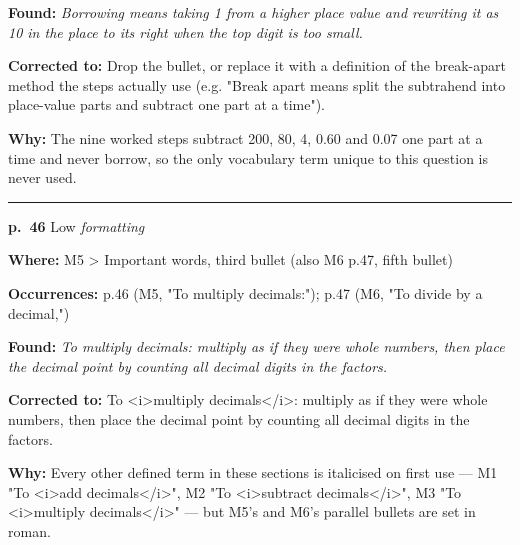 \documentclass[11pt]{article}
\newcommand{\sevlow}[1]{\textcolor{black!55}{#1}}
\begin{document}
\noindent\textbf{Found: }\textit{Borrowing means taking 1 from a higher place value and rewriting it as 10 in the place to its right when the top digit is too small.}\par
\noindent\textbf{Corrected to: }Drop the bullet, or replace it with a definition of the break-apart method the steps actually use (e.g. "Break apart means split the subtrahend into place-value parts and subtract one part at a time").\par
\noindent\textbf{Why: }The nine worked steps subtract 200, 80, 4, 0.60 and 0.07 one part at a time and never borrow, so the only vocabulary term unique to this question is never used.\par\vspace{4pt}
\noindent\rule{\textwidth}{0.4pt}\par\nobreak\vspace{2pt}
\noindent\textbf{p.~46} \quad \sevlow{Low} \quad \textit{formatting}\par
\noindent\textbf{Where: }M5 > Important words, third bullet (also M6 p.47, fifth bullet)\par
\noindent\textbf{Occurrences: }p.46 (M5, "To multiply decimals:"); p.47 (M6, "To divide by a decimal,")\par
\noindent\textbf{Found: }\textit{To multiply decimals: multiply as if they were whole numbers, then place the decimal point by counting all decimal digits in the factors.}\par
\noindent\textbf{Corrected to: }To <i>multiply decimals</i>: multiply as if they were whole numbers, then place the decimal point by counting all decimal digits in the factors.\par
\noindent\textbf{Why: }Every other defined term in these sections is italicised on first use --- M1 "To <i>add decimals</i>", M2 "To <i>subtract decimals</i>", M3 "To <i>multiply decimals</i>" --- but M5's and M6's parallel bullets are set in roman.\par\vspace{4pt}
\end{document}
